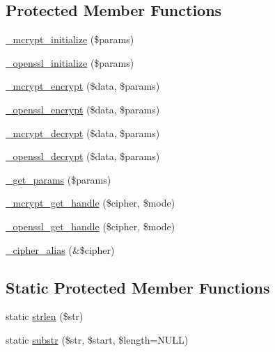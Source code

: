 \subsection*{Protected Member Functions}
\begin{DoxyCompactItemize}
\item 
\hyperlink{class_c_i___encryption_abf302acf347b00301e055943940a0c08}{\+\_\+mcrypt\+\_\+initialize} (\$params)
\item 
\hyperlink{class_c_i___encryption_ac867f7f42841784f234ce934318340f7}{\+\_\+openssl\+\_\+initialize} (\$params)
\item 
\hyperlink{class_c_i___encryption_a9bd463b7c807315f4518e9caff68939a}{\+\_\+mcrypt\+\_\+encrypt} (\$data, \$params)
\item 
\hyperlink{class_c_i___encryption_ad013a80183158b98c314d5d8641933c4}{\+\_\+openssl\+\_\+encrypt} (\$data, \$params)
\item 
\hyperlink{class_c_i___encryption_a7d3a3c3cc3609b5af60bfa953892a058}{\+\_\+mcrypt\+\_\+decrypt} (\$data, \$params)
\item 
\hyperlink{class_c_i___encryption_a37f8642a2440f6f7d507d5a7a563de59}{\+\_\+openssl\+\_\+decrypt} (\$data, \$params)
\item 
\hyperlink{class_c_i___encryption_ab5bb04b4151b23afd9dccad358b3967b}{\+\_\+get\+\_\+params} (\$params)
\item 
\hyperlink{class_c_i___encryption_a93399ba15094e793aede8da7dc1f06aa}{\+\_\+mcrypt\+\_\+get\+\_\+handle} (\$cipher, \$mode)
\item 
\hyperlink{class_c_i___encryption_aa6db6b226eb918ae0630158730c1fcdb}{\+\_\+openssl\+\_\+get\+\_\+handle} (\$cipher, \$mode)
\item 
\hyperlink{class_c_i___encryption_a2b585f447a6282e702dd3153baf3d68f}{\+\_\+cipher\+\_\+alias} (\&\$cipher)
\end{DoxyCompactItemize}
\subsection*{Static Protected Member Functions}
\begin{DoxyCompactItemize}
\item 
static \hyperlink{class_c_i___encryption_a4c29a687d4ed62c26a10e41d98930d5f}{strlen} (\$str)
\item 
static \hyperlink{class_c_i___encryption_a101caef57ef0b165da5747e2c2e6c9dc}{substr} (\$str, \$start, \$length=N\+U\+L\+L)
\end{DoxyCompactItemize}
